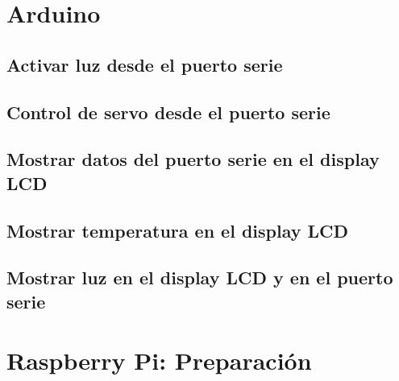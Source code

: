 \graphicspath{{./1/}}

\chapter{Arduino}

\section{Activar luz desde el puerto serie}



\section{Control de servo desde el puerto serie}



\section{Mostrar datos del puerto serie en el display LCD}



\section{Mostrar temperatura en el display LCD}



\section{Mostrar luz en el display LCD y en el puerto serie}



\chapter{Raspberry Pi: Preparación}

